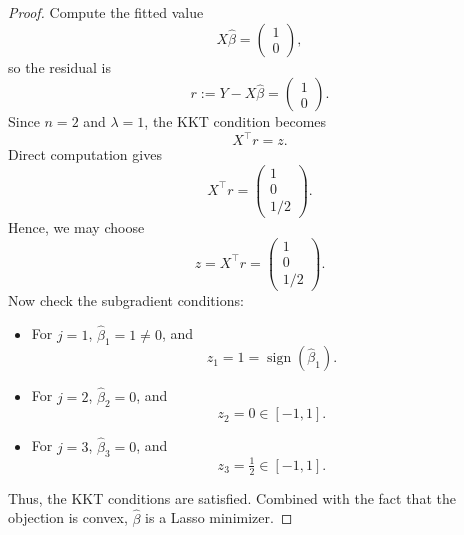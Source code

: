 \documentclass[12pt]{article}
\renewcommand{\(}{\left(}%
\renewcommand{\)}{\right)}%
\renewcommand{\[}{\left[}%
\renewcommand{\]}{\right]}%
\newtheorem{proof}{Proof.}}
\begin{document}
\begin{proof}
Compute the fitted value
\begin{equation*}
X\hat\beta=
\begin{pmatrix}
1\\
0
\end{pmatrix},
\end{equation*}
so the residual is
\begin{equation*}
r:=Y-X\hat\beta
=
\begin{pmatrix}
1\\
0
\end{pmatrix}.
\end{equation*}
Since $n=2$ and $\lambda=1$, the KKT condition becomes
\begin{equation*}
X^\top r=z .
\end{equation*}
Direct computation gives
\begin{equation*}
X^\top r
=
\begin{pmatrix}
1\\
0\\
1/2
\end{pmatrix}.
\end{equation*}
Hence, we may choose
\begin{equation*}
z=X^\top r=
\begin{pmatrix}
1\\
0\\
1/2
\end{pmatrix}.
\end{equation*}
Now check the subgradient conditions:

\begin{itemize}
\item For $j=1$, $\hat\beta_1=1\neq0$, and
\begin{equation*}
z_1=1=\operatorname{sign}(\hat\beta_1).
\end{equation*}

\item For $j=2$, $\hat\beta_2=0$, and
\begin{equation*}
z_2=0\in[-1,1].
\end{equation*}

\item For $j=3$, $\hat\beta_3=0$, and
\begin{equation*}
z_3=\tfrac12\in[-1,1].
\end{equation*}
\end{itemize}
Thus, the KKT conditions are satisfied. Combined with the fact that the objection is convex, $\hat\beta$ is a Lasso minimizer.


\end{proof}
\end{document}
